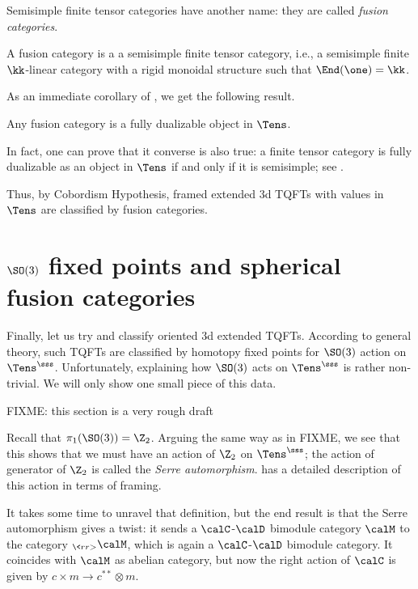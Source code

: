 Semisimple finite tensor categories have another name: they are called
\emph{fusion categories}.


\begin{definition}\label{d:fusion}
  A fusion category is a a semisimple finite tensor category, i.e., a semisimple
  finite $\kk$-linear category with a rigid monoidal structure such that
  $\End(\one)=\kk$.
\end{definition}

As an immediate corollary of , we get the
following result.
\begin{corollary}\label{c:fusion-fd}
  Any fusion category is a fully dualizable object in $\Tens$.
\end{corollary}

In fact, one can prove that it converse is also true: a finite tensor
category is fully dualizable as an object in $\Tens$ if and only if it is
semisimple; see \cite[Proposition 3.4.10]{dsps-dualizable}.

Thus, by Cobordism Hypothesis, framed extended 3d TQFTs with values in $\Tens$
are classified by fusion categories.


\section{$\SO(3)$ fixed points and spherical
    fusion categories}\label{s:spherical1}

Finally, let us try and classify oriented 3d extended TQFTs. According to
general theory, such TQFTs are classified by homotopy fixed points for $\SO(3)$
action on $\Tens^\sss$. Unfortunately, explaining how $\SO(3)$ acts on
$\Tens^\sss$ is rather non-trivial. We will only show one small piece of this
data.

FIXME: this section is a very rough draft

Recall that $\pi_1(\SO(3))=\Z_2$. Arguing the same way as in FIXME, we see that
this shows that we must have an action of $\Z_2$ on $\Tens^\sss$; the action of
generator of $\Z_2$ is called the \emph{Serre automorphism}.
\cite{dsps-dualizable} has a detailed description of this action in terms of
framing.

It takes some time to unravel that definition, but the end result is that the
Serre automorphism gives a twist: it sends a $\calC$-$\calD$ bimodule category
$\calM$ to the category ${}_{\<rr>}\calM$, which is again a $\calC$-$\calD$
bimodule category. It coincides with $\calM$ as abelian category, but now the
right action of $\calC$ is given by $c\times m\to c^{**}\otimes m$.

